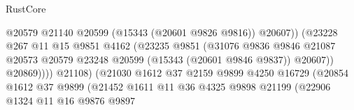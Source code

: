 \begin{lexlean}{RustCore}
\begin{coremodule}
                                                  @20579
                                                  @21140
                                                  @20599
                                                  (@15343 (@20601 @9826 @9816))
                                                  @20607))
                                              (@23228
                                                @267
                                                @11
                                                @15
                                                @9851
                                                @4162
                                                (@23235
                                                  @9851
                                                  (@31076
                                                    @9836
                                                    @9846
                                                    @21087
                                                    @20573
                                                    @20579
                                                    @23248
                                                    @20599
                                                    (@15343 (@20601 @9846 @9837))
                                                    @20607))
                                                @20869))))
                                        @21108)
                                      (@21030
                                        @1612
                                        @37
                                        @2159
                                        @9899
                                        @4250
                                        @16729
                                        (@20854
                                          @1612
                                          @37
                                          @9899
                                          (@21452
                                            @1611
                                            @11
                                            @36
                                            @4325
                                            @9898
                                            @21199
                                            (@22906
                                              @1324
                                              @11
                                              @16
                                              @9876
                                              @9897

\end{coremodule}
\end{lexlean}
